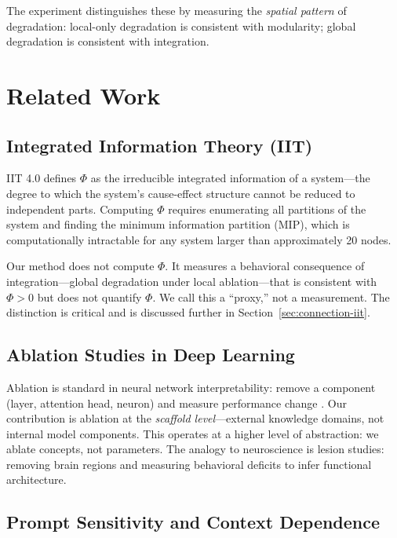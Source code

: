\documentclass[12pt,letterpaper]{article}
\begin{document}
The experiment distinguishes these by measuring the \emph{spatial pattern} of degradation: local-only degradation is consistent with modularity; global degradation is consistent with integration.

\section{Related Work}
\label{sec:related}

\subsection{Integrated Information Theory (IIT)}

IIT 4.0 \citep{tononi2023iit4} defines $\Phi$ as the irreducible integrated information of a system---the degree to which the system's cause-effect structure cannot be reduced to independent parts. Computing $\Phi$ requires enumerating all partitions of the system and finding the minimum information partition (MIP), which is computationally intractable for any system larger than approximately 20 nodes.

Our method does not compute $\Phi$. It measures a behavioral consequence of integration---global degradation under local ablation---that is consistent with $\Phi > 0$ but does not quantify $\Phi$. We call this a ``proxy,'' not a measurement. The distinction is critical and is discussed further in Section~\ref{sec:connection-iit}.

\subsection{Ablation Studies in Deep Learning}

Ablation is standard in neural network interpretability: remove a component (layer, attention head, neuron) and measure performance change \citep{meyes2019ablation, elhage2022superposition}. Our contribution is ablation at the \emph{scaffold level}---external knowledge domains, not internal model components. This operates at a higher level of abstraction: we ablate concepts, not parameters. The analogy to neuroscience is lesion studies: removing brain regions and measuring behavioral deficits to infer functional architecture.

\subsection{Prompt Sensitivity and Context Dependence}
\end{document}
